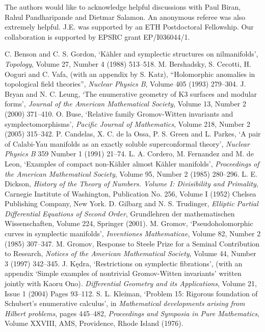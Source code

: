 \documentclass[11pt]{amsart}
\numberwithin{equation}{section}
\theoremstyle{definition}
\theoremstyle{remark}
\begin{document}
The authors would like to acknowledge helpful discussions with Paul Biran, Rahul Pandharipande and Dietmar Salamon. An anonymous referee was also extremely helpful. J.E. was supported by an ETH Postdoctoral Fellowship. Our collaboration is supported by EPSRC grant EP/I036044/1.

\begin{thebibliography}{1}
  C. Benson and C. S. Gordon, `K\"{a}hler and symplectic structures on nilmanifolds', {\em Topology}, Volume 27, Number 4 (1988) 513--518.
  M. Bershadsky, S. Cecotti, H. Ooguri and C. Vafa, (with an appendix by S. Katz), ``Holomorphic anomalies in topological field theories'', {\em Nuclear Physics B}, Volume 405 (1993) 279--304.
  J. Bryan and N. C. Leung, `The enumerative geometry of {K3} surfaces and modular forms', {\em Journal of the American Mathematical Society}, Volume 13, Number 2 (2000) 371--410.
  O. Buse, `Relative family Gromov-Witten invariants and symplectomorphisms', {\em Pacific Journal of Mathematics}, Volume 218, Number 2 (2005) 315--342.
  P. Candelas, X. C. de la Ossa, P. S. Green and L. Parkes, `A pair of Calabi-Yau manifolds as an exactly soluble superconformal theory', {\em Nuclear Physics B} 359 Number 1 (1991) 21--74.
  L. A. Cordero, M. Fernandez and M. de Leon, `Examples of compact non-K\"{a}hler almost K\"{a}hler manifolds', {\em Proceedings of the American Mathematical Society}, Volume 95, Number 2 (1985) 280--296.
  L. E. Dickson, {\em History of the Theory of Numbers. Volume I: Divisibility and Primality}, Carnegie Institute of Washington, Publication No. 256, Volume I (1952) Chelsea Publishing Company, New York.
  D. Gilbarg and N. S. Trudinger, {\em Elliptic Partial Differential Equations of Second Order}, Grundlehren der mathematischen Wissenschaften, Volume 224, Springer (2001).
  M. Gromov, `Pseudoholomorphic curves in symplectic manifolds', {\em Inventiones Mathematicae}, Volume 82, Number 2 (1985) 307--347.
  M. Gromov, Response to Steele Prize for a Seminal Contribution to Research, {\em Notices of the American Mathematical Society}, Volume 44, Number 3 (1997) 342--345.
  J. K\k{e}dra, `Restrictions on symplectic fibrations', (with an appendix `Simple examples of nontrivial Gromov-Witten invariants' written jointly with Kaoru Ono). {\em Differential Geometry and its Applications}, Volume 21, Issue 1 (2004) Pages 93--112.
  S. L. Kleiman, `Problem 15: Rigorous foundation of Schubert's enumerative calculus', in {\em Mathematical developments arising from Hilbert problems}, pages 445--482, {\em Proceedings and Symposia in Pure Mathematics}, Volume XXVIII, AMS, Providence, Rhode Island (1976).

\end{thebibliography}
\end{document}
